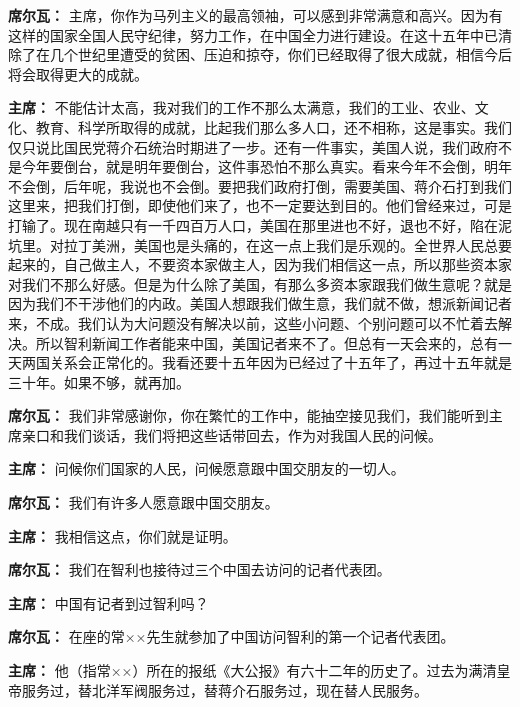 \begin{duihua}
\item[\textbf{席尔瓦：}] 主席，你作为马列主义的最高领袖，可以感到非常满意和高兴。因为有这样的国家全国人民守纪律，努力工作，在中国全力进行建设。在这十五年中已清除了在几个世纪里遭受的贫困、压迫和掠夺，你们已经取得了很大成就，相信今后将会取得更大的成就。

\item[\textbf{主席：}] 不能估计太高，我对我们的工作不那么太满意，我们的工业、农业、文化、教育、科学所取得的成就，比起我们那么多人口，还不相称，这是事实。我们仅只说比国民党蒋介石统治时期进了一步。还有一件事实，美国人说，我们政府不是今年要倒台，就是明年要倒台，这件事恐怕不那么真实。看来今年不会倒，明年不会倒，后年呢，我说也不会倒。要把我们政府打倒，需要美国、蒋介石打到我们这里来，把我们打倒，即使他们来了，也不一定要达到目的。他们曾经来过，可是打输了。现在南越只有一千四百万人口，美国在那里进也不好，退也不好，陷在泥坑里。对拉丁美洲，美国也是头痛的，在这一点上我们是乐观的。全世界人民总要起来的，自己做主人，不要资本家做主人，因为我们相信这一点，所以那些资本家对我们不那么好感。但是为什么除了美国，有那么多资本家跟我们做生意呢？就是因为我们不干涉他们的内政。美国人想跟我们做生意，我们就不做，想派新闻记者来，不成。我们认为大问题没有解决以前，这些小问题、个别问题可以不忙着去解决。所以智利新闻工作者能来中国，美国记者来不了。但总有一天会来的，总有一天两国关系会正常化的。我看还要十五年因为已经过了十五年了，再过十五年就是三十年。如果不够，就再加。

\item[\textbf{席尔瓦：}] 我们非常感谢你，你在繁忙的工作中，能抽空接见我们，我们能听到主席亲口和我们谈话，我们将把这些话带回去，作为对我国人民的问候。

\item[\textbf{主席：}] 问候你们国家的人民，问候愿意跟中国交朋友的一切人。

\item[\textbf{席尔瓦：}] 我们有许多人愿意跟中国交朋友。

\item[\textbf{主席：}] 我相信这点，你们就是证明。

\item[\textbf{席尔瓦：}] 我们在智利也接待过三个中国去访问的记者代表团。

\item[\textbf{主席：}] 中国有记者到过智利吗？

\item[\textbf{席尔瓦：}] 在座的常××先生就参加了中国访问智利的第一个记者代表团。

\item[\textbf{主席：}] 他（指常××）所在的报纸《大公报》有六十二年的历史了。过去为满清皇帝服务过，替北洋军阀服务过，替蒋介石服务过，现在替人民服务。


\end{duihua}
